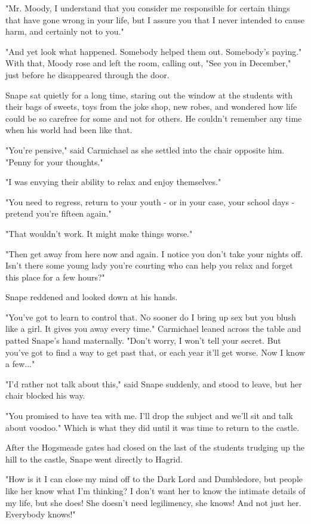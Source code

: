 "Mr. Moody, I understand that you consider me responsible for certain things that have gone wrong in your life, but I assure you that I never intended to cause harm, and certainly not to you."

"And yet look what happened. Somebody helped them out. Somebody's paying." With that, Moody rose and left the room, calling out, "See you in December," just before he disappeared through the door.

Snape sat quietly for a long time, staring out the window at the students with their bags of sweets, toys from the joke shop, new robes, and wondered how life could be so carefree for some and not for others. He couldn't remember any time when his world had been like that.

"You're pensive," said Carmichael as she settled into the chair opposite him. "Penny for your thoughts."

"I was envying their ability to relax and enjoy themselves."

"You need to regress, return to your youth - or in your case, your school days - pretend you're fifteen again."

"That wouldn't work. It might make things worse."

"Then get away from here now and again. I notice you don't take your nights off. Isn't there some young lady you're courting who can help you relax and forget this place for a few hours?"

Snape reddened and looked down at his hands.

"You've got to learn to control that. No sooner do I bring up sex but you blush like a girl. It gives you away every time." Carmichael leaned across the table and patted Snape's hand maternally. "Don't worry, I won't tell your secret. But you've got to find a way to get past that, or each year it'll get worse. Now I know a few..."

"I'd rather not talk about this," said Snape suddenly, and stood to leave, but her chair blocked his way.

"You promised to have tea with me. I'll drop the subject and we'll sit and talk about voodoo." Which is what they did until it was time to return to the castle.

After the Hogsmeade gates had closed on the last of the students trudging up the hill to the castle, Snape went directly to Hagrid.

"How is it I can close my mind off to the Dark Lord and Dumbledore, but people like her know what I'm thinking? I don't want her to know the intimate details of my life, but she does! She doesn't need legilimency, she knows! And not just her. Everybody knows!"

